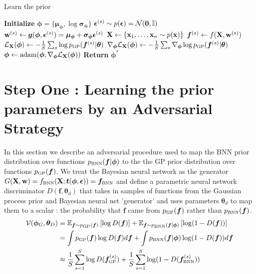 \documentclass{article}
\begin{document}
\begin{algorithm}
\caption{Learn the prior}
\begin{algorithmic}[1]
\State \textbf{Initialize} $\bm \phi =\{ \bm \mu _{\bm \phi} , \log \bm \sigma _{\bm \phi}  \}$
    \State $ \bm \epsilon ^{(s)} \sim p(\bm \epsilon) = \mathcal{N} ( \mathbf{0} , \mathbb{I}) $
    \State $ \mathbf{w}  ^{(s)} \gets \bm g(\bm \phi, \bm \epsilon^{(s)}) = \bm \mu _{\bm \phi} + \bm \sigma _{\bm \phi}\bm \epsilon ^{(s)}$
    \State $ \mathbf{X}  \gets \{  \mathbf{x} _1, \dots ,  \mathbf{x} _n \sim p( \mathbf{x} )\}$ 
    \State $\bm f ^{(s)} \gets   f( \mathbf{X}  ,  \mathbf{w} ^{(s)} )$ 
    \State $ \elbo _{\X} ( \bm \phi ) \gets   -\frac{1}{S} \sum_s \log \pgp (\bm f ^{(s)}| \bm \theta ) $
    \State   $\nabla _{\bm \phi} \elbo _{\tiny \X} (\bm \phi )\gets -\frac{1}{S} \sum_s \nabla _{\bm \phi}\log \pgp (\bm f ^{(s)}| \bm \theta ) $
    \State $\bm \phi \gets \text{adam}(\bm\phi ,\nabla _{\bm \phi} \elbo _{\tiny \X} (\bm \phi ) )$
\EndWhile
\State \textbf{Return} $\bm \phi^*$
\end{algorithmic}
\end{algorithm}

\newpage 

\section{ Step One : Learning the prior parameters by an Adversarial Strategy}


In this section we describe an adversarial procedure used to map   
the BNN prior distribution over functions $\pbnn (\bm f |  \bm \phi ) $ to the 
the GP prior distribution over functions  $\pgp (\bm f )$. 
We treat the Bayesian neural network as the generator 
$G(\X , \B w ) =  f _{ \text{\tiny BNN}}(\X ; \bm t(\bm \phi, \bm \epsilon)  ) =\bm f _{ \text{\tiny BNN}}$ 
and define a parametric neural network discriminator $D(\bm f , \bm \theta_d )$ that 
takes in samples of functions from the Gaussian process prior and 
Bayesian neural net 'generator' and uses parameters $ \bm \theta_d $ to map
them to a scalar : the probability
that $\bm f$ came from $\pgp (\bm f )$  rather than $\pbnn (\bm f )$.
\begin{align}
    \mathcal V (\bm \phi_G, \bm \theta_D)&= 
    \E_{\bm f \sim \pgp (\bm f )}\BB{\log D(\bm f) } +
    \E_{\bm f \sim \pbnn (\bm f |  \bm \phi ) }  \BB{ \log (1- D(\bm f))  } \\
    &= \int \pgp (\bm f ) \log D(\bm f) d\bm f +  
       \int \pbnn (\bm f |  \bm \phi ) \log (1- D(\bm f)) d\bm f  \\
    &\approx \frac{1}{S} \sum_{s=1}^S \log D (\bm f ^{(s)}_{ \text{\tiny GP}} ) +
             \frac{1}{S} \sum_{s=1}^S \log (1-D (\bm f ^{(s)}_{ \text{\tiny BNN}} ) )
\end{align}
\end{document}
